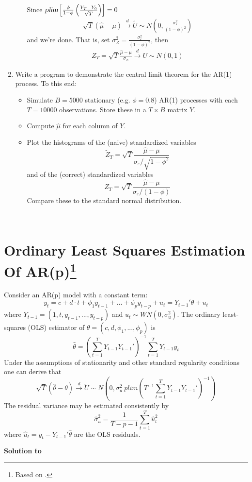 \documentclass[a4paper]{scrartcl}
\begin{document}
\begin{enumerate}
\begin{enumerate}
\begin{solution}
		Since $\textsl{plim}\left[\frac{\phi}{1-\phi}\left(\frac{Y_T - Y_0}{\sqrt{T}}\right)\right] = 0$
		\begin{align*}
		\sqrt{T}\left(\hat{\mu}-\mu\right) \overset{d}{\rightarrow} \tilde{U} \sim N\left(0,\frac{\sigma_\varepsilon^2}{(1-\phi)^2}\right)
		\end{align*}
		and we're done. That is, set $\sigma_Z^2 = \frac{\sigma_\varepsilon^2}{(1-\phi)^2}$, then
		\begin{align*}
		Z_T = \sqrt{T}\frac{\hat{\mu}-\mu}{\sigma_Z} \overset{d}{\rightarrow} U \sim N(0,1)
		\end{align*}
		\end{solution}
	\end{enumerate}
	\item Write a program to demonstrate the central limit theorem for the AR(1) process. To this end:
	\begin{itemize}
		\item Simulate $B=5000$ stationary (e.g. $\phi=0.8$) AR(1) processes with each $T=10000$ observations. Store these in a $T \times B$ matrix $Y$.
		\item Compute $\hat{\mu}$ for each column of $Y$.
		\item Plot the histograms of the (naive) standardized variables $$ \widetilde{Z}_T = \sqrt{T}\frac{\hat{\mu}-\mu}{\sigma_{\varepsilon }/\sqrt{1-\phi^2}}$$ and of the (correct) standardized variables $$ Z_T = \sqrt{T}\frac{\hat{\mu}-\mu}{\sigma_{\varepsilon }/(1-\phi)}$$ Compare these to the standard normal distribution.
	\end{itemize}
	\begin{solution}~
		
\newpage %
	\end{solution}
\end{enumerate}
\newpage




\section[Ordninary Least Squares Estimation Of AR(p)]{Ordinary Least Squares Estimation Of AR(p)\footnote{Based on \cite{Luetkepohl.2004}.}}\label{ex:OLSARp}
Consider an AR(p) model with a constant term:
$$ y_t = c + d\cdot t + \phi_1 y_{t-1} +... + \phi_p y_{t-p} +u_{t}=Y_{t-1}'\theta + u_t$$
where $Y_{t-1}=(1,t,y_{t-1},...,y_{t-p})$ and $u_t\sim WN(0,\sigma_u^2)$. The ordinary least-squares (OLS) estimator of $\theta = (c,d,\phi_1,...,\phi_p)$ is $$\hat{\theta} = \left(\sum_{t=1}^TY_{t-1}Y_{t-1}'\right)^{-1}\sum_{t=1}^T Y_{t-1} y_t$$ Under the assumptions of stationarity and other standard regularity conditions one can derive that
$$\sqrt{T}(\hat{\theta}-\theta)\overset{d}{\rightarrow}\tilde{U}\sim N\left(0,\sigma_u^2 ~plim\left(T^{-1}\sum_{t=1}^T Y_{t-1}Y_{t-1}'\right)^{-1} \right)$$
The residual variance may be estimated consistently by $$\hat{\sigma}_u^2 = \frac{1}{T-p-1}\sum_{t=1}^T\hat{u}_t^2$$ where $\hat{u}_t=y_t -Y_{t-1}'\hat{\theta}$ are the OLS residuals.
\begin{solution}\textbf{Solution to }\end{solution}
\end{document}
